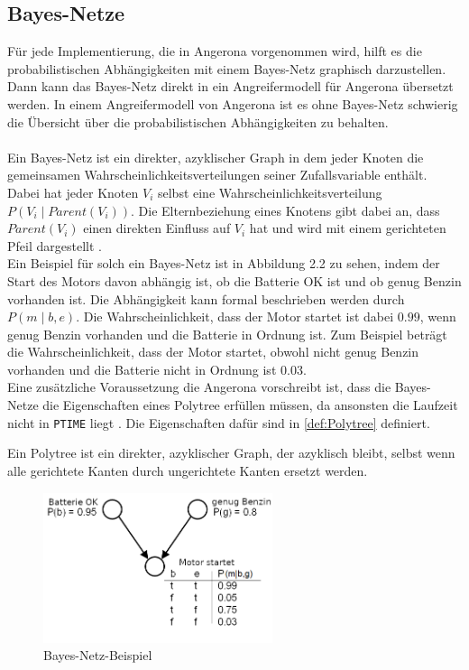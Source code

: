 \documentclass[german,version-2020-11]{uzl-thesis}
\begin{document}
\subsection{Bayes-Netze} \label{sub:bayes}
Für jede Implementierung, die in Angerona vorgenommen wird, hilft es die probabilistischen Abhängigkeiten mit einem Bayes-Netz graphisch darzustellen. Dann kann das Bayes-Netz direkt in ein Angreifermodell für Angerona übersetzt werden. In einem Angreifermodell von Angerona ist es ohne Bayes-Netz schwierig die Übersicht über die probabilistischen Abhängigkeiten zu behalten.\\ \\
Ein Bayes-Netz ist ein direkter, azyklischer Graph in dem jeder Knoten die gemeinsamen Wahrscheinlichkeitsverteilungen seiner Zufallsvariable enthält. Dabei hat jeder Knoten $V_i$ selbst eine Wahrscheinlichkeitsverteilung $P(V_i \mid Parent(V_i) )$. Die Elternbeziehung eines Knotens gibt dabei an, dass $Parent(V_i) $ einen direkten Einfluss auf $V_i$ hat und wird  mit einem gerichteten Pfeil dargestellt \cite{3}.\\  Ein Beispiel für solch ein Bayes-Netz ist in Abbildung 2.2 zu sehen, indem der Start des Motors davon abhängig ist, ob die Batterie OK ist und ob genug Benzin vorhanden ist. Die Abhängigkeit kann formal beschrieben werden durch $P(m \mid b,e)$. Die Wahrscheinlichkeit, dass der Motor startet ist dabei $0.99$, wenn genug Benzin vorhanden und die Batterie in Ordnung ist. Zum Beispiel beträgt die Wahrscheinlichkeit, dass der Motor startet, obwohl nicht genug Benzin vorhanden und die Batterie nicht in Ordnung ist $0.03$. \\
Eine zusätzliche Voraussetzung die Angerona vorschreibt ist, dass die Bayes-Netze die Eigenschaften eines Polytree erfüllen müssen, da ansonsten die Laufzeit nicht in \texttt{PTIME} liegt \cite{guarnieri2017securing}. Die Eigenschaften dafür sind in \cref{def:Polytree} definiert.
 \begin{definition}[Polytree]\label{def:Polytree}
	Ein Polytree ist ein direkter, azyklischer Graph, der azyklisch bleibt, selbst wenn alle gerichtete Kanten durch ungerichtete Kanten ersetzt werden.
\end{definition}
\begin{figure}[ht]
	\centering
	\includegraphics[width=0.6\textwidth]{bayes-netz-bsp.PNG}
	\caption{Bayes-Netz-Beispiel \cite{10}}
	\label{fig}
\end{figure}
\end{document}
